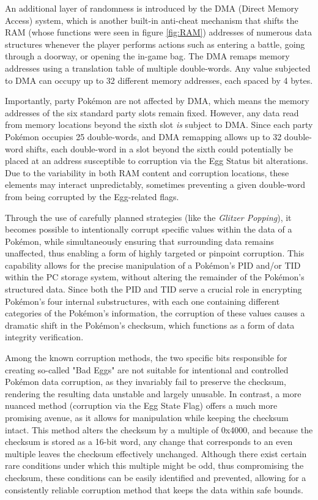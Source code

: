 \documentclass[a4paper]{usiinfbachelorproject}
\begin{document}
\newpage

An additional layer of randomness is introduced by the DMA (Direct Memory Access) system, which is another built-in anti-cheat mechanism that shifts the RAM (whose functions were seen in figure \ref{fig:RAM}) addresses of numerous data structures whenever the player performs actions such as entering a battle, going through a doorway, or opening the in-game bag. The DMA remaps memory addresses using a translation table of multiple double-words. Any value subjected to DMA can occupy up to 32 different memory addresses, each spaced by 4 bytes.

Importantly, party Pokémon are not affected by DMA, which means the memory addresses of the six standard party slots remain fixed. However, any data read from memory locations beyond the sixth slot \textit{is} subject to DMA. Since each party Pokémon occupies 25 double-words, and DMA remapping allows up to 32 double-word shifts, each double-word in a slot beyond the sixth could potentially be placed at an address susceptible to corruption via the Egg Status bit alterations. Due to the variability in both RAM content and corruption locations, these elements may interact unpredictably, sometimes preventing a given double-word from being corrupted by the Egg-related flags.

Through the use of carefully planned strategies (like the \textit{Glitzer Popping}), it becomes possible to intentionally corrupt specific values within the data of a Pokémon, while simultaneously ensuring that surrounding data remains unaffected, thus enabling a form of highly targeted or pinpoint corruption. This capability allows for the precise manipulation of a Pokémon's PID and/or TID within the PC storage system, without altering the remainder of the Pokémon’s structured data. Since both the PID and TID serve a crucial role in encrypting Pokémon’s four internal substructures, with each one containing different categories of the Pokémon’s information, the corruption of these values causes a dramatic shift in the Pokémon’s checksum, which functions as a form of data integrity verification.

Among the known corruption methods, the two specific bits responsible for creating so-called "Bad Eggs" are not suitable for intentional and controlled Pokémon data corruption, as they invariably fail to preserve the checksum, rendering the resulting data unstable and largely unusable. In contrast, a more nuanced method (corruption via the Egg State Flag) offers a much more promising avenue, as it allows for manipulation while keeping the checksum intact. This method alters the checksum by a multiple of 0x4000, and because the checksum is stored as a 16-bit word, any change that corresponds to an even multiple leaves the checksum effectively unchanged. Although there exist certain rare conditions under which this multiple might be odd, thus compromising the checksum, these conditions can be easily identified and prevented, allowing for a consistently reliable corruption method that keeps the data within safe bounds.
\end{document}
